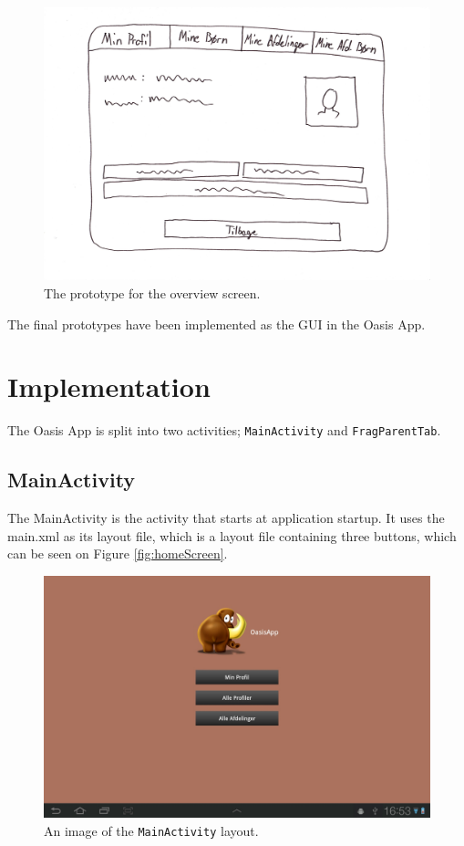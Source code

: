 \begin{figure}[htbp]
	\centering
		\includegraphics[width=\textwidth]{Images/overviewScreenPrototype}
	\caption{The prototype for the overview screen.}
	\label{fig:overviewScreenProto}
\end{figure}

The final prototypes have been implemented as the GUI in the Oasis App.

\section{Implementation}
\label{sec:AppImp}
The Oasis App is split into two activities; \texttt{MainActivity} and \texttt{FragParentTab}.

\subsection{MainActivity}
The MainActivity is the activity that starts at application startup. It uses the main.xml as its layout file, which is a layout file containing three buttons, which can be seen on Figure \vref{fig:homeScreen}. 

\begin{figure}[htbp]
	\centering
		\includegraphics[width=\textwidth]{Images/homeScreen}
	\caption{An image of the \texttt{MainActivity} layout.}
	\label{fig:homeScreen}
\end{figure}

